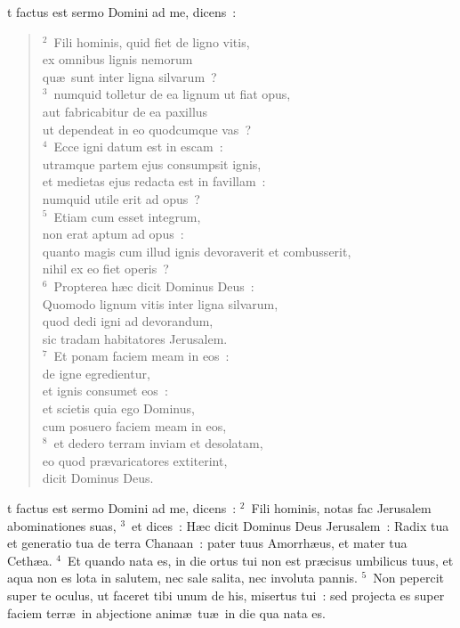 \bchapter
{}t factus est sermo Domini ad me, dicens~:
\begin{verse}\vspace{6pt}${}^{2}$~Fili hominis, quid fiet de ligno vitis,\\ ex omnibus lignis nemorum\\ qu\ae\ sunt inter ligna silvarum~?\\
${}^{3}$~numquid tolletur de ea lignum ut fiat opus,\\ aut fabricabitur de ea paxillus\\ ut dependeat in eo quodcumque vas~?\\
${}^{4}$~Ecce igni datum est in escam~:\\ utramque partem ejus consumpsit ignis,\\ et medietas ejus redacta est in favillam~:\\ numquid utile erit ad opus~?\\
${}^{5}$~Etiam cum esset integrum,\\ non erat aptum ad opus~:\\ quanto magis cum illud ignis devoraverit et combusserit,\\ nihil ex eo fiet operis~?\\
${}^{6}$~Propterea h\ae c dicit Dominus Deus~:\\ Quomodo lignum vitis inter ligna silvarum,\\ quod dedi igni ad devorandum,\\ sic tradam habitatores Jerusalem.\\
${}^{7}$~Et ponam faciem meam in eos~:\\ de igne egredientur,\\ et ignis consumet eos~:\\ et scietis quia ego Dominus,\\ cum posuero faciem meam in eos,\\
${}^{8}$~et dedero terram inviam et desolatam,\\ eo quod pr\ae varicatores extiterint,\\ dicit Dominus Deus.\end{verse}



\bchapter
{}t factus est sermo Domini ad me, dicens~:
${}^{2}$~Fili hominis, notas fac Jerusalem abominationes suas,
${}^{3}$~et dices~: H\ae c dicit Dominus Deus Jerusalem~: Radix tua et generatio tua de terra Chanaan~: pater tuus Amorrh\ae us, et mater tua Ceth\ae a.
${}^{4}$~Et quando nata es, in die ortus tui non est pr\ae cisus umbilicus tuus, et aqua non es lota in salutem, nec sale salita, nec involuta pannis.
${}^{5}$~Non pepercit super te oculus, ut faceret tibi unum de his, misertus tui~: sed projecta es super faciem terr\ae\ in abjectione anim\ae\ tu\ae\ in die qua nata es.


